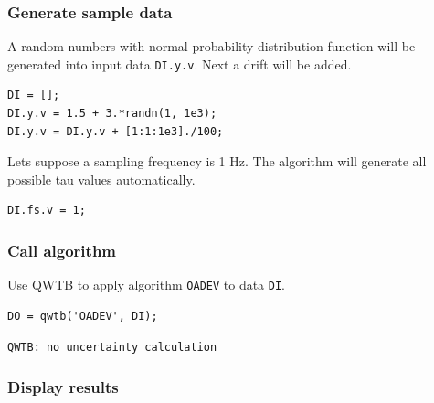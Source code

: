 \startcontents[localtoc]



{}
\subsubsection*{Generate sample data}



A random numbers with normal probability distribution function will be generated into input data \texttt{DI.y.v}. Next a drift will be added.

\begin{lstlisting}
DI = [];
DI.y.v = 1.5 + 3.*randn(1, 1e3);
DI.y.v = DI.y.v + [1:1:1e3]./100;
\end{lstlisting}


Lets suppose a sampling frequency is 1 Hz. The algorithm will generate all possible tau values automatically.

\begin{lstlisting}
DI.fs.v = 1;
\end{lstlisting}


{}
\subsubsection*{Call algorithm}



Use QWTB to apply algorithm \texttt{OADEV} to data \texttt{DI}.

\begin{lstlisting}
DO = qwtb('OADEV', DI);
\end{lstlisting}
\begin{lstlisting}[language={},xleftmargin=5pt,frame=none]
QWTB: no uncertainty calculation

\end{lstlisting}


{}
\subsubsection*{Display results}



